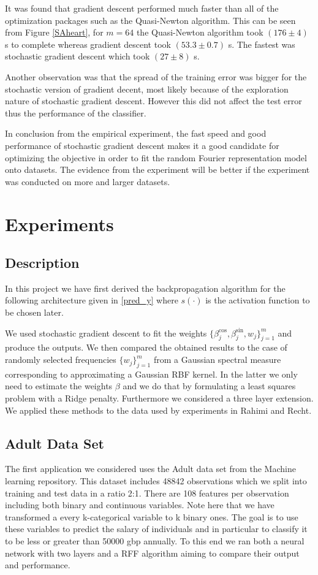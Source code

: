 \documentclass{article} %
\begin{document}
It was found that gradient descent performed much faster than all of the optimization packages such as the Quasi-Newton algorithm. This can be seen from Figure \ref{SAheart}, for $m=64$ the Quasi-Newton algorithm took $(176\pm 4)$ s to complete whereas gradient descent took $(53.3\pm 0.7)$ s. The fastest was stochastic gradient descent which took $(27\pm 8)$ s.

Another observation was that the spread of the training error was bigger for the stochastic version of gradient decent, most likely because of the exploration nature of stochastic gradient descent. However this did not affect the test error thus the performance of the classifier.

In conclusion from the empirical experiment, the fast speed and good performance of stochastic gradient descent makes it a good candidate for optimizing the objective in order to fit the random Fourier representation model onto datasets. The evidence from the experiment will be better if the experiment was conducted on more and larger datasets.




\section{Experiments}
\subsection{Description}
In this project we have first derived the backpropagation algorithm for the following architecture given in \eqref{pred_y}
where $s(\cdot)$ is the activation function to be chosen later.

We used stochastic gradient descent to fit the weights $\{\beta_{j}^{\cos}, \beta_{j}^{\sin}, w_{j} \}_{j=1}^{m}$ and produce the outputs. We then compared the obtained results to the case of randomly selected frequencies  $ \{w_{j}\}_{j=1}^{m}$ from a Gaussian spectral measure corresponding to approximating a Gaussian RBF kernel. In the latter we only need to estimate the weights $\beta$ and we do that by formulating a least squares problem with a Ridge penalty. Furthermore we considered a three layer extension. We applied these methods to the data used by experiments in Rahimi and Recht. \cite{Rahimi}

\subsection{Adult Data Set}
The first application we considered uses the Adult data set from the Machine learning repository. This dataset includes 48842 observations which we split into training and test data in a ratio 2:1. There are 108 features per observation including both binary and continuous variables. Note here that we have transformed a every k-categorical variable to k binary ones.  The goal is to use these variables to predict the salary of individuals and in particular to classify it to be less or greater than 50000 gbp annually. To this end we ran both a neural network with two layers and a RFF algorithm aiming to compare their output and performance. 
\end{document}
